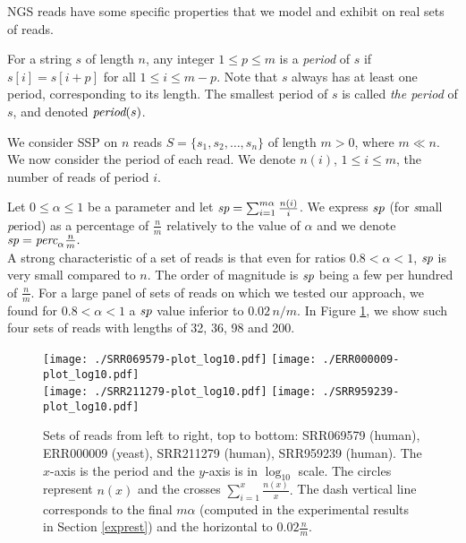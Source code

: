 \documentclass[10pt]{article}
\newcommand{\cn}{\textrm{\it sp}}
\begin{document}
NGS reads have some specific properties that we model and exhibit on
real sets of reads.

For a string $s$ of length $n$, any integer $1 \le p \le m$ is a
\emph{period} of $s$ if $s[i] = s[i+p]$ for all $1 \le i \le
m-p$. Note that $s$ always has at least one period, corresponding to its
length. The smallest period of $s$ is called \emph{the period} of $s$,
and denoted $\mbox{\em period}(s)$.


We consider SSP on $n$ reads $S=\{s_1,s_2,\ldots ,s_n\}$ of length
$m>0$, where $m\ll n$. We now consider the period of each read. We
denote $n(i)$, $1 \leq i \leq m$, the number of reads of period $i$. 



Let $0 \leq \alpha \leq 1$ be a parameter and let $\cn =
\sum_{i=1}^{m\alpha} \frac{n(i)}{i}$. We express $\cn$ (for {\em s}mall {\em p}eriod) as a percentage
of $\frac{n}{m}$ relatively to the value of $\alpha$ and we
denote  $\cn = \mbox{\em perc}_{\alpha} \frac{n}{m}.$\\

A strong characteristic of a set of reads is that even for ratios $ 0.8
< \alpha < 1 $, $\cn$ is very small compared to $n$. The order of
magnitude is $\cn$ being a few per hundred of $\frac{n}{m}$. For a
large panel of sets of reads on which we tested our approach, we found
for $ 0.8 < \alpha < 1 $ a $\cn$ value inferior to $0.02 \, n/m$. In
Figure \ref{plotsreads}, we show such four sets of reads with lengths
of 32, 36, 98 and 200.







\begin{figure}[t]
\begin{centering}
\texttt{[image: ./SRR069579-plot\_log10.pdf]}
\texttt{[image: ./ERR000009-plot\_log10.pdf]}\\[-4mm]
\texttt{[image: ./SRR211279-plot\_log10.pdf]}
\texttt{[image: ./SRR959239-plot\_log10.pdf]}
\vspace*{-0.3cm}
\caption{Sets of reads from left to right, top to bottom: SRR069579
  (human), ERR000009 (yeast), SRR211279 (human), SRR959239
  (human). The $x$-axis is the period and the $y$-axis is in $\log_{10}$
  scale. The circles represent $n(x)$ and the crosses $\sum_{i=1}^{x} \frac{n(x)}{x}.$ The dash
  vertical line corresponds to the final $m\alpha$ (computed in the
  experimental results in Section \ref{exprest}) and the horizontal to
  $0.02\frac{n}{m}.$}
\label{plotsreads}
\end{centering}
\end{figure}
\end{document}
